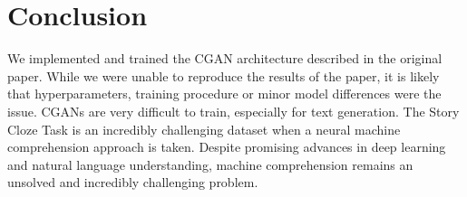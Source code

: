 \documentclass{article}
\begin{document}
\section{Conclusion}
We implemented and trained the CGAN architecture described in the original paper. While we were unable to reproduce the results of the paper, it is likely that hyperparameters, training procedure or minor model differences were the issue. CGANs are very difficult to train, especially for text generation. The Story Cloze Task is an incredibly challenging dataset when a  neural machine comprehension approach is taken. Despite promising advances in deep learning and natural language understanding, machine comprehension remains an unsolved and incredibly challenging problem.


\end{document}
